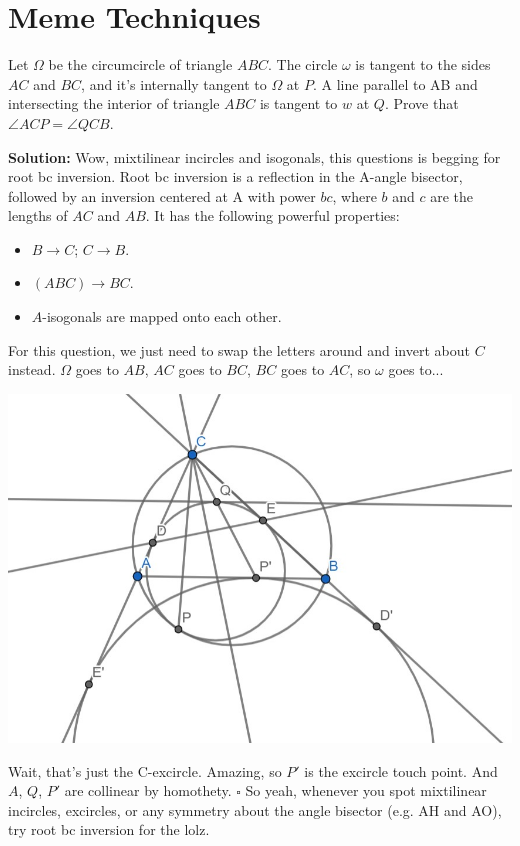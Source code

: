 \documentclass{scrartcl}
\begin{document}
\section{Meme Techniques}
\begin{problem} [EGMO 2013/5]
Let $\Omega$ be the circumcircle of triangle $ABC$. The circle $\omega$ is tangent to the sides $AC$ and $BC$, and it's internally tangent to $\Omega$ at $P$. A line parallel to AB and intersecting the interior of triangle $ABC$ is tangent to $w$ at $Q$. Prove that $\angle ACP = \angle QCB$.
\end{problem}
\textbf{Solution:} Wow, mixtilinear incircles and isogonals, this questions is begging for root bc inversion. \newline
Root bc inversion is a reflection in the A-angle bisector, followed by an inversion centered at A with power $bc$, where $b$ and $c$ are the lengths of $AC$ and $AB$. It has the following powerful properties:
\begin{itemize}
  \item $B \rightarrow C$; $C \rightarrow B$.
  \item $(ABC) \rightarrow BC$.
  \item $A$-isogonals are mapped onto each other. 
\end{itemize}
For this question, we just need to swap the letters around and invert about $C$ instead. $\Omega$ goes to $AB$, $AC$ goes to $BC$, $BC$ goes to $AC$, so $\omega$ goes to...\newline
\begin{center}
    \includegraphics[scale=0.8]{egmo20135.jpg}
\end{center}
Wait, that's just the C-excircle. \newline
Amazing, so $P'$ is the excircle touch point. And $A$, $Q$, $P'$ are collinear by homothety. $\square$\newline
So yeah, whenever you spot mixtilinear incircles, excircles, or any symmetry about the angle bisector (e.g. AH and AO), try root bc inversion for the lolz.
\end{document}
